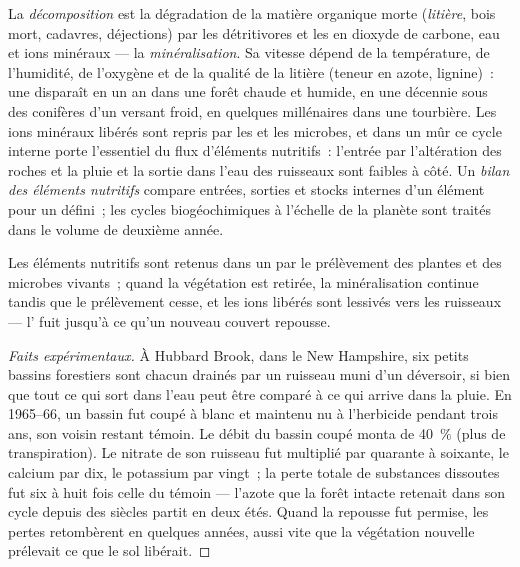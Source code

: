 \begin{definition}\label{def:b1:ecosystem-dynamics:decomposition}
La \emph{décomposition} est la dégradation de la matière organique
morte (\emph{litière}, bois mort, cadavres, déjections) par les
détritivores et les  en dioxyde de carbone, eau et ions
minéraux --- la \emph{minéralisation}. Sa vitesse dépend de la
température, de l'humidité, de l'oxygène et de la qualité de la litière
(teneur en azote, lignine)~: une  disparaît en un an dans une
forêt chaude et humide, en une décennie sous des conifères d'un versant
froid, en quelques millénaires dans une tourbière. Les ions minéraux
libérés sont repris par les  et les microbes, et dans un
 mûr ce cycle interne porte l'essentiel du flux d'éléments
nutritifs~: l'entrée par l'altération des roches et la pluie et la
sortie dans l'eau des ruisseaux sont faibles à côté. Un \emph{bilan des
éléments nutritifs} compare entrées, sorties et stocks internes d'un
élément pour un  défini~; les cycles biogéochimiques à
l'échelle de la planète sont traités dans le volume de deuxième année.
\end{definition}

\begin{proposition}\label{prop:b1:ecosystem-dynamics:retention}
Les éléments nutritifs sont retenus dans un  par le
prélèvement des plantes et des microbes vivants~; quand la végétation
est retirée, la minéralisation continue tandis que le prélèvement
cesse, et les ions libérés sont lessivés vers les ruisseaux ---
l' fuit jusqu'à ce qu'un nouveau couvert repousse.
\end{proposition}
\begin{proof}[Faits expérimentaux]
À Hubbard Brook, dans le New Hampshire, six petits bassins forestiers
sont chacun drainés par un ruisseau muni d'un déversoir, si bien que
tout ce qui sort dans l'eau peut être comparé à ce qui arrive dans la
pluie. En 1965--66, un bassin fut coupé à blanc et maintenu nu à
l'herbicide pendant trois ans, son voisin restant témoin. Le débit du
bassin coupé monta de \qty{40}{\%} (plus de transpiration). Le nitrate
de son ruisseau fut multiplié par quarante à soixante, le calcium par
dix, le potassium par vingt~; la perte totale de substances dissoutes
fut six à huit fois celle du témoin --- l'azote que la forêt intacte
retenait dans son cycle depuis des siècles partit en deux étés. Quand
la repousse fut permise, les pertes retombèrent en quelques années,
aussi vite que la végétation nouvelle prélevait ce que le sol libérait.
\end{proof}

